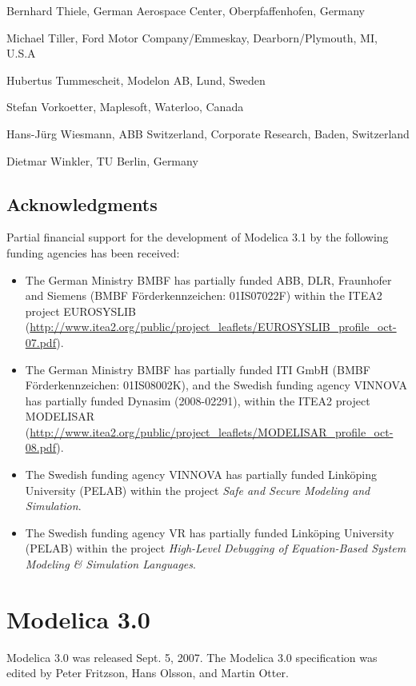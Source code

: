 Bernhard Thiele, German Aerospace Center, Oberpfaffenhofen, Germany

Michael Tiller, Ford Motor Company/Emmeskay, Dearborn/Plymouth, MI,
U.S.A

Hubertus Tummescheit, Modelon AB, Lund, Sweden

Stefan Vorkoetter, Maplesoft, Waterloo, Canada

Hans-Jürg Wiesmann, ABB Switzerland, Corporate Research, Baden,
Switzerland

Dietmar Winkler, TU Berlin, Germany

\subsection{Acknowledgments}

Partial financial support for the development of Modelica 3.1 by the
following funding agencies has been received:

\begin{itemize}
\item
  The German Ministry BMBF has partially funded ABB, DLR, Fraunhofer and
  Siemens (BMBF Förderkennzeichen: 01IS07022F) within the ITEA2 project
  EUROSYSLIB
  (\url{http://www.itea2.org/public/project_leaflets/EUROSYSLIB_profile_oct-07.pdf}).
\item
  The German Ministry BMBF has partially funded ITI GmbH (BMBF
  Förderkennzeichen: 01IS08002K), and the Swedish funding agency VINNOVA
  has partially funded Dynasim (2008-02291), within the ITEA2 project
  MODELISAR
  (\url{http://www.itea2.org/public/project_leaflets/MODELISAR_profile_oct-08.pdf}).
\item
  The Swedish funding agency VINNOVA has partially funded Linköping
  University (PELAB) within the project \emph{Safe and Secure Modeling and
  Simulation}.
\item
  The Swedish funding agency VR has partially funded Linköping
  University (PELAB) within the project \emph{High-Level Debugging of
  Equation-Based System Modeling \& Simulation Languages}.
\end{itemize}

\section{Modelica 3.0}

Modelica 3.0 was released Sept. 5, 2007. The Modelica 3.0 specification
was edited by Peter Fritzson, Hans Olsson, and Martin Otter.

